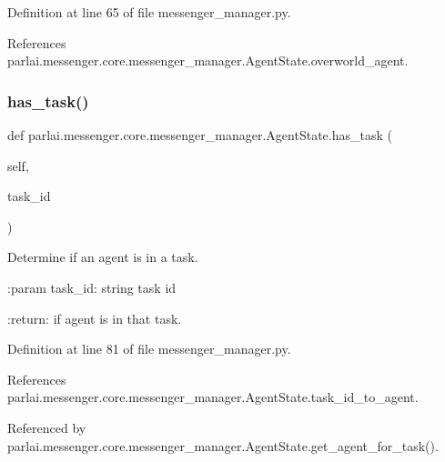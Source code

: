 Definition at line 65 of file messenger\+\_\+manager.\+py.



References parlai.\+messenger.\+core.\+messenger\+\_\+manager.\+Agent\+State.\+overworld\+\_\+agent.

\mbox{\label{classparlai_1_1messenger_1_1core_1_1messenger__manager_1_1AgentState_af642027e7465f3c99e4000c0eeb9292c}} 
\subsubsection{\texorpdfstring{has\+\_\+task()}{has\_task()}}
{\footnotesize\ttfamily def parlai.\+messenger.\+core.\+messenger\+\_\+manager.\+Agent\+State.\+has\+\_\+task (\begin{DoxyParamCaption}\item[{}]{self,  }\item[{}]{task\+\_\+id }\end{DoxyParamCaption})}

\begin{DoxyVerb}Determine if an agent is in a task.

:param task_id:
    string task id

:return:
    if agent is in that task.
\end{DoxyVerb}
 

Definition at line 81 of file messenger\+\_\+manager.\+py.



References parlai.\+messenger.\+core.\+messenger\+\_\+manager.\+Agent\+State.\+task\+\_\+id\+\_\+to\+\_\+agent.



Referenced by parlai.\+messenger.\+core.\+messenger\+\_\+manager.\+Agent\+State.\+get\+\_\+agent\+\_\+for\+\_\+task().

